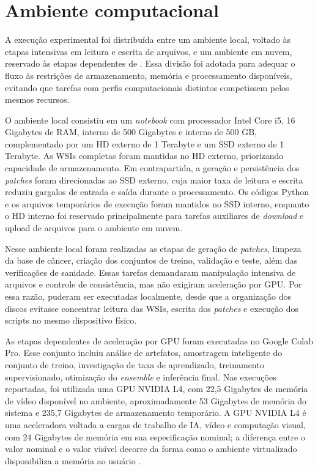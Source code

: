 \section{Ambiente computacional}\label{sec:met_ambiente_computacional}

A execução experimental foi distribuída entre um ambiente local, voltado às etapas intensivas em leitura e escrita de arquivos, e um ambiente em nuvem, reservado às etapas dependentes de . Essa divisão foi adotada para adequar o fluxo às restrições de armazenamento, memória e processamento disponíveis, evitando que tarefas com perfis computacionais distintos competissem pelos mesmos recursos.

O ambiente local consistiu em um \textit{notebook} com processador Intel Core i5, 16 Gigabytes de RAM,  interno de 500 Gigabytes e  interno de 500 GB, complementado por um HD externo de 1 Terabyte e um SSD externo de 1 Terabyte. As WSIs completas foram mantidas no HD externo, priorizando capacidade de armazenamento. Em contrapartida, a geração e persistência dos \textit{patches} foram direcionadas ao SSD externo, cuja maior taxa de leitura e escrita reduziu gargalos de entrada e saída durante o processamento. Os códigos Python e os arquivos temporários de execução foram mantidos no SSD interno, enquanto o HD interno foi reservado principalmente para tarefas auxiliares de \textit{download} e upload de arquivos para o ambiente em nuvem.

Nesse ambiente local foram realizadas as etapas de geração de \textit{patches}, limpeza da base de câncer, criação dos conjuntos de treino, validação e teste, além das verificações de sanidade. Essas tarefas demandaram manipulação intensiva de arquivos e controle de consistência, mas não exigiram aceleração por GPU. Por essa razão, puderam ser executadas localmente, desde que a organização dos discos evitasse concentrar leitura das WSIs, escrita dos \textit{patches} e execução dos scripts no mesmo dispositivo físico.

As etapas dependentes de aceleração por GPU foram executadas no Google Colab Pro. Esse conjunto incluiu análise de artefatos, amostragem inteligente do conjunto de treino, investigação de taxa de aprendizado, treinamento supervisionado, otimização do \textit{ensemble} e inferência final. Nas execuções reportadas, foi utilizada uma GPU NVIDIA L4, com 22{,}5 Gigabytes de memória de vídeo disponível no ambiente, aproximadamente 53 Gigabytes de memória  do sistema e 235{,}7 Gigabytes de armazenamento temporário. A GPU NVIDIA L4 é uma aceleradora voltada a cargas de trabalho de IA, vídeo e computação visual, com 24 Gigabytes de memória em sua especificação nominal; a diferença entre o valor nominal e o valor visível decorre da forma como o ambiente virtualizado disponibiliza a memória ao usuário \cite{nvidia_l4}. 

